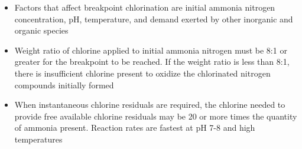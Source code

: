 			\begin{itemize}
				\item Factors that affect breakpoint chlorination are initial ammonia nitrogen concentration, pH, temperature, and demand exerted by other inorganic and organic species
				\item Weight ratio of chlorine applied to initial ammonia nitrogen must be 8:1 or greater for the breakpoint to be reached. If the weight ratio is less than 8:1, there is insufficient chlorine present to oxidize the chlorinated nitrogen compounds initially formed
				\item When instantaneous chlorine residuals are required, the chlorine needed to provide free available chlorine residuals may be 20 or more times the quantity of ammonia present. Reaction rates are fastest at pH 7-8 and high temperatures
			\end{itemize}
